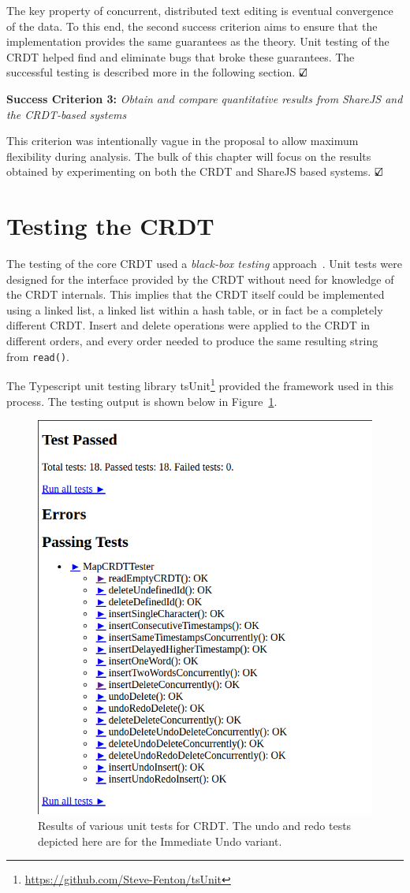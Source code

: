 \documentclass[12pt,a4paper,twoside,openright]{report}
\begin{document}
	The key property of concurrent, distributed text editing is eventual convergence of the data. To this end, the second success criterion aims to ensure that the implementation provides the same guarantees as the theory. Unit testing of the CRDT helped find and eliminate bugs that broke these guarantees. The successful testing is described more in the following section. $\text{\rlap{$\checkmark$}}\square$
	

	\textbf{Success Criterion 3:} \textit{Obtain and compare quantitative results from ShareJS and the CRDT-based systems}
	
	This criterion was intentionally vague in the proposal to allow maximum flexibility during analysis. The bulk of this chapter will focus on the results obtained by experimenting on both the CRDT and ShareJS based systems.	$\text{\rlap{$\checkmark$}}\square$
	
	
	\section{Testing the CRDT}
	
	The testing of the core CRDT used a \textit{black-box testing} approach~\cite{Patton}. Unit tests were designed for the interface provided by the CRDT without need for knowledge of the CRDT internals. This implies that the CRDT itself could be implemented using a linked list, a linked list within a hash table, or in fact be a completely different CRDT. Insert and delete operations were applied to the CRDT in different orders, and every order needed to produce the same resulting string from \texttt{read()}.
	
	The Typescript unit testing library tsUnit\footnote{\url{https://github.com/Steve-Fenton/tsUnit}} provided the framework used in this process. The testing output is shown below in Figure~\ref{fig:unittests}.

	\begin{figure}[htb]
	\centering
	\includegraphics[width=0.56\linewidth]{figs/unittests.png}
	\caption[Unit tests for CRDT]{Results of various unit tests for CRDT. The undo and redo tests depicted here are for the Immediate Undo variant.}
	\label{fig:unittests}
	\end{figure}
	
\end{document}
